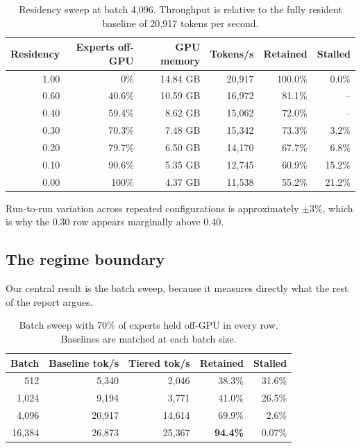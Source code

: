 \documentclass[10pt,a4paper]{article}
\begin{document}
\begin{table}[htbp]
\centering\small
\caption{Residency sweep at batch 4{,}096. Throughput is relative to the fully
resident baseline of 20{,}917 tokens per second.}
\label{tab:residency}
\begin{tabular}{rrrrrr}
\toprule
Residency & Experts off-GPU & GPU memory & Tokens/s & Retained & Stalled \\
\midrule
1.00 & 0\%     & 14.84 GB & 20{,}917 & 100.0\% & 0.0\% \\
0.60 & 40.6\%  & 10.59 GB & 16{,}972 & 81.1\%  &  --   \\
0.40 & 59.4\%  &  8.62 GB & 15{,}062 & 72.0\%  &  --   \\
0.30 & 70.3\%  &  7.48 GB & 15{,}342 & 73.3\%  & 3.2\% \\
0.20 & 79.7\%  &  6.50 GB & 14{,}170 & 67.7\%  & 6.8\% \\
0.10 & 90.6\%  &  5.35 GB & 12{,}745 & 60.9\%  & 15.2\% \\
0.00 & 100\%   &  4.37 GB & 11{,}538 & 55.2\%  & 21.2\% \\
\bottomrule
\end{tabular}
\end{table}


Run-to-run variation across repeated configurations is approximately
$\pm 3\%$, which is why the 0.30 row appears marginally above 0.40.

\subsection{The regime boundary}

Our central result is the batch sweep, because it measures directly what the rest
of the report argues.

\begin{table}[htbp]
\centering\small
\caption{Batch sweep with 70\% of experts held off-GPU in every row. Baselines are
matched at each batch size.}
\label{tab:batch}
\begin{tabular}{rrrrr}
\toprule
Batch & Baseline tok/s & Tiered tok/s & Retained & Stalled \\
\midrule
512     &  5{,}340 &  2{,}046 & 38.3\% & 31.6\% \\
1{,}024 &  9{,}194 &  3{,}771 & 41.0\% & 26.5\% \\
4{,}096 & 20{,}917 & 14{,}614 & 69.9\% &  2.6\% \\
16{,}384 & 26{,}873 & 25{,}367 & \textbf{94.4\%} & 0.07\% \\
\bottomrule
\end{tabular}
\end{table}
\end{document}
